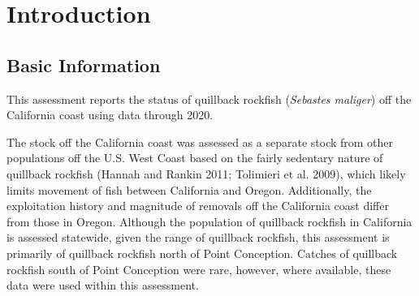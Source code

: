 \documentclass[11pt,
  english,
  a4paper,
]{article}
\begin{document}
\newcommand{\lt}{\ensuremath <}
\newcommand{\gt}{\ensuremath >}


\setcounter{page}{1}

\renewcommand{\thetable}{\roman{table}}
\renewcommand{\thefigure}{\roman{figure}}

\setlength\parskip{0.5em plus 0.1em minus 0.2em}

\vspace{500cm}

\pagebreak

\pagebreak
{}
\setcounter{page}{1}
\renewcommand{\thefigure}{\arabic{figure}}
\renewcommand{\thetable}{\arabic{table}}
\setcounter{table}{0}
\setcounter{figure}{0}


\hypertarget{introduction}{%
\section{Introduction}\label{introduction}}

\leavevmode\tagmcend\tagstructend


\hypertarget{basic-information}{%
\subsection{Basic Information}\label{basic-information}}

\leavevmode\tagmcend\tagstructend


This assessment reports the status of quillback rockfish (\emph{Sebastes maliger}) off the California coast using data through 2020.

\leavevmode\tagmcend\tagstructend\par


The stock off the California coast was assessed as a separate stock from other populations off the U.S. West Coast based on the fairly sedentary nature of quillback rockfish {(Hannah and Rankin 2011; Tolimieri et al. 2009)\leavevmode\tagmcend\tagstructend}, which likely limits movement of fish between California and Oregon. Additionally, the exploitation history and magnitude of removals off the California coast differ from those in Oregon. Although the population of quillback rockfish in California is assessed statewide, given the range of quillback rockfish, this assessment is primarily of quillback rockfish north of Point Conception. Catches of quillback rockfish south of Point Conception were rare, however, where available, these data were used within this assessment.
\end{document}
